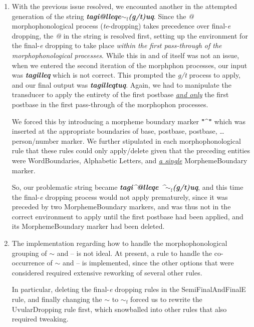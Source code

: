 \documentclass{article}
\begin{document}
\begin{enumerate}
\item With the previous issue resolved, we encounted another in the attempted generation of the string \textit{\textbf{tagi@lleqe${\sim}_\text{f}$(g/t)uq}}. Since the \textit{@} morphophonological process (\textit{te}-dropping) takes precedence over final-\textit{e} dropping, the \textit{@} in the string is resolved first, setting up the environment for the final-\textit{e} dropping to take place \textit{within the first pass-through of the morphophonological processes}. While this in and of itself was not an issue, when we entered the second iteration of the morphphon processes, our input was \textit{\textbf{tagilleq}} which is not correct. This prompted the \textit{g/t} process to apply, and our final output was \textit{\textbf{tagilleqtuq}}. Again, we had to manipulate the transducer to apply the entirety of the first postbase \textit{\uline{and only}} the first postbase in the first pass-through of the morphophon processes.

We forced this by introducing a morpheme boundary marker \textbf{"\textasciicircum"} which was inserted at the appropriate boundaries of base, postbase, postbase, \ldots person/number marker. We further stipulated in each morphophonological rule that these rules could only apply/delete given that the preceding entities were WordBoundaries, Alphabetic Letters, and \textit{\uline{a single}} MorphemeBoundary marker.

So, our problematic string became \textit{\textbf{tagi\textasciicircum @lleqe \textasciicircum ${\sim}_\text{f}$(g/t)uq}}, and this time the final-\textit{e} dropping process would not apply prematurely, since it was preceded by two MorphemeBoundary markers, and was thus not in the correct environment to apply until the first postbase had been applied, and its MorphemeBoundary marker had been deleted.

\item The implementation regarding how to handle the morphophonological grouping of $\sim$ and -- is not ideal.
%
At present, a rule to handle the co-occurrence of $\sim$ and -- is implemented, since the other options that were considered required extensive reworking of several other rules.

In particular, deleting the final-\textit{e} dropping rules in the SemiFinalAndFinalE rule, and finally changing the $\sim$ to $\sim_\text{f}$ forced us to rewrite the UvularDropping rule first, which snowballed into other rules that also required tweaking.


\end{enumerate}
\end{document}
